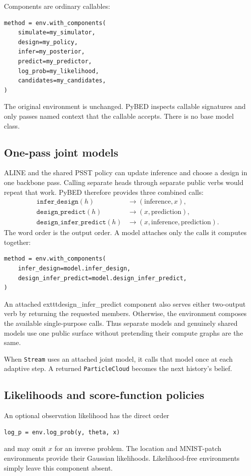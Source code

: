 \documentclass[11pt]{article}
\begin{document}
Components are ordinary callables:
\begin{lstlisting}
method = env.with_components(
    simulate=my_simulator,
    design=my_policy,
    infer=my_posterior,
    predict=my_predictor,
    log_prob=my_likelihood,
    candidates=my_candidates,
)
\end{lstlisting}
The original environment is unchanged. PyBED inspects callable signatures and only
passes named context that the callable accepts. There is no base model class.

\subsection{One-pass joint models}

ALINE and the shared PSST policy can update inference and choose a design in one
backbone pass. Calling separate heads through separate public verbs would repeat
that work. PyBED therefore provides three combined calls:
\begin{align*}
 \texttt{infer\_design}(h)
   &\longrightarrow (\text{inference},x),\\
 \texttt{design\_predict}(h)
   &\longrightarrow (x,\text{prediction}),\\
 \texttt{design\_infer\_predict}(h)
   &\longrightarrow (x,\text{inference},\text{prediction}).
\end{align*}
The word order is the output order. A model attaches only the calls it computes
together:
\begin{lstlisting}
method = env.with_components(
    infer_design=model.infer_design,
    design_infer_predict=model.design_infer_predict,
)
\end{lstlisting}
An attached 	exttt{design_infer_predict} component also serves either two-output
verb by returning the requested members. Otherwise, the environment composes the
available single-purpose calls. Thus separate models and genuinely shared models
use one public surface without pretending their compute graphs are the same.

When \texttt{Stream} uses an attached joint model, it calls that model once at each
adaptive step. A returned \texttt{ParticleCloud} becomes the next history's belief.

\subsection{Likelihoods and score-function policies}

An optional observation likelihood has the direct order
\begin{lstlisting}
log_p = env.log_prob(y, theta, x)
\end{lstlisting}
and may omit $x$ for an inverse problem. The location and MNIST-patch environments
provide their Gaussian likelihoods. Likelihood-free environments simply leave this
component absent.
\end{document}
